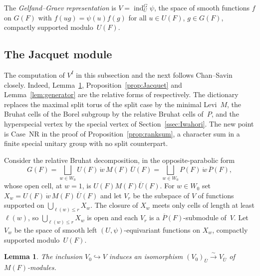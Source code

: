 \documentclass[11pt]{amsart}
\newtheorem{lemma}[theorem]{Lemma}
\theoremstyle{definition}
\theoremstyle{remark}
\DeclareMathOperator{\ind}{ind}
\newcommand{\barr}[1]{\overline{#1}}
\begin{document}
The \emph{Gelfand--Graev representation} is $V = \ind_U^G \psi$, the space of smooth functions $f$ on $G(F)$ with $f(ug) = \psi(u)f(g)$ for all $u \in U(F)$, $g \in G(F)$, compactly supported modulo~$U(F)$.


\subsection{The Jacquet module}\label{ssec:Jacquet}

The computation of $V^I$ in this subsection and the next follows Chan--Savin closely. Indeed, Lemma~\ref{lem:open_cell}, Proposition~\ref{prop:Jacquet} and Lemma~\ref{lem:generator} are the relative forms of \cite[Lem.~4.1, Prop.~4.2, Lem.~4.3]{CS} respectively. The dictionary replaces the maximal split torus of the split case by the minimal Levi~$M$, the Bruhat cells of the Borel subgroup by the relative Bruhat cells of~$P$, and the hyperspecial vertex by the special vertex of Section~\ref{ssec:Iwahori}. The new point is Case~NR in the proof of Proposition~\ref{prop:ranksum}, a character sum in a finite special unitary group with no split counterpart.

Consider the relative Bruhat decomposition, in the opposite-parabolic form
\[
G(F) = \bigsqcup_{w \in W_0} U(F)\,\dot{w}\,M(F)\,\barr{U}(F)
= \bigsqcup_{w \in W_0} P(F)\,\dot{w}\,\barr{P}(F),
\]
whose open cell, at $w = 1$, is $U(F)M(F)\barr{U}(F)$. For $w \in W_0$ set $X_w = U(F)\,\dot{w}\,M(F)\,\barr{U}(F)$ and let $V_r$ be the subspace of $V$ of functions supported on $\bigcup_{\ell(w)\le r} X_w$. The closure of $X_w$ meets only cells of length at least $\ell(w)$, so $\bigcup_{\ell(w)\le r}X_w$ is open and each $V_r$ is a $\barr{P}(F)$-submodule of~$V$. Let $V_w$ be the space of smooth left $(U,\psi)$-equivariant functions on $X_w$, compactly supported modulo~$U(F)$.

\begin{lemma}\label{lem:open_cell}
The inclusion $V_0 \hookrightarrow V$ induces an isomorphism $(V_0)_{\barr{U}} \xrightarrow{\sim} V_{\barr{U}}$ of $M(F)$-modules.
\end{lemma}
\end{document}
